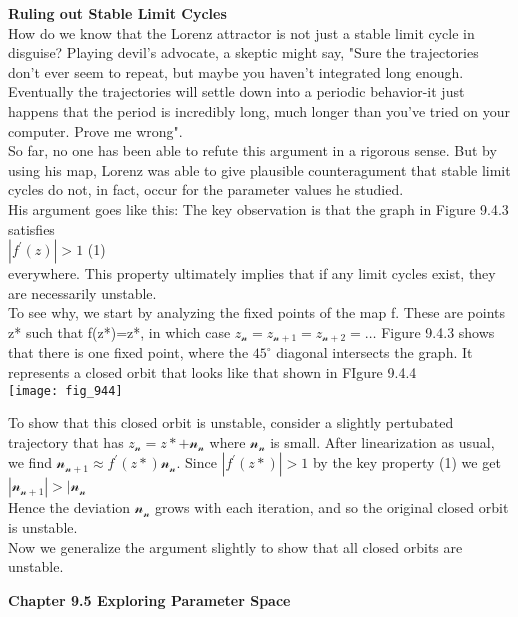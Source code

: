 \documentclass{article}
\newcommand\tab[1][1cm]{\hspace*{#1}}
\begin{document}
\textbf {Ruling out Stable Limit Cycles} \\ \tab
How do we know that the Lorenz attractor is not just a stable limit cycle in disguise? Playing devil's advocate, a skeptic might say, "Sure the trajectories don't ever seem to repeat, but maybe you haven't integrated long enough. Eventually the trajectories will settle down into a periodic behavior-it just happens that the period is incredibly long, much longer than you've tried on your computer. Prove me wrong". \\ \tab
So far, no one has been able to refute this argument in a rigorous sense. But by using his map, Lorenz was able to give plausible counteragument that stable limit cycles do not, in fact, occur for the parameter values he studied. \\ \tab
His argument goes like this: The key observation is that the graph in Figure 9.4.3 satisfies \\ \tab \tab
$|f^{'}(z)|>1$ \tab (1) \\

everywhere. This property ultimately implies that if any limit cycles exist, they are necessarily unstable. \\ \tab
To see why, we start by analyzing the fixed points of the map f. These are points z* such that f(z*)=z*, in which case $z_{\mathcal{n}}=z_{\mathcal{n}+1}=z_{\mathcal{n}+2}=\hdots$ Figure 9.4.3 shows that there is one fixed point, where the $45^{\circ}$ diagonal intersects the graph. It represents a closed orbit that looks like that shown in FIgure 9.4.4 \\

\texttt{[image: fig\_944]} 

To show that this closed orbit is unstable, consider a slightly pertubated trajectory that has $z_{\mathcal{n}}=z*+\mathscr{n}_{\mathcal{n}}$ where $\mathscr{n}_{\mathcal{n}}$ is small. After linearization as usual, we find $\mathscr{n}_{\mathcal{n}+1} \approx f^{'}(z*)\mathscr{n}_{\mathcal{n}}$. Since $|f^{'}(z*)|>1$ by the key property (1) we get \\ \tab \tab
$|\mathscr{n}_{\mathcal{n}+1}|>|\mathscr{n}_{\mathcal{n}}$ \\
Hence the deviation $\mathscr{n}_{\mathcal{n}}$ grows with each iteration, and so the original closed orbit is unstable. \\ \tab
Now we generalize the argument slightly to show that all closed orbits are unstable.

\textbf {Chapter 9.5 Exploring Parameter Space}
\end{document}
